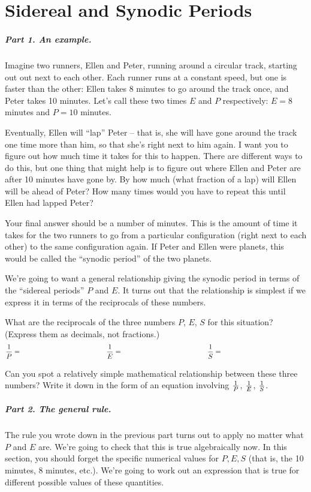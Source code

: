 \chapter{Sidereal and Synodic Periods}


\paragraph{Part 1. An example.}
Imagine two runners, Ellen and Peter,
running around a circular track, starting out
out next to each other. Each runner runs at a constant speed, but one 
is faster than the other: Ellen takes 8 minutes to go around the track
once, and Peter takes 10 minutes. Let's call these two times
$E$ and $P$ respectively: $E=8$ minutes and $P=10$ minutes.


Eventually, Ellen will ``lap'' Peter -- that is, she will have gone around
the track one time more than him, so that she's right
next to him again. I want
you to figure out how much time it takes for this to happen.
There are different ways to do this, but one thing that might help
is to figure out where Ellen and Peter are after 10 minutes have gone by.
By how much (what fraction of a lap) will Ellen will be ahead of 
Peter? How many times would you have to repeat this until Ellen
had lapped Peter?

Your final answer should be a number of minutes. This is the amount
of time it takes for the two runners to go from a particular configuration
(right next to each other) to the same configuration again. If Peter and Ellen
were planets, this would be called the ``synodic period'' of the two planets.

\vskip 2in


We're going to want a general relationship giving the synodic period
in terms of the ``sidereal periods'' $P$ and $E$. It turns
out that the relationship is simplest if we express it in terms
of the reciprocals of these numbers.

What are the reciprocals of the three numbers $P$, $E$, $S$ for
this situation? (Express them as decimals, not fractions.)
$$
{1\over P}=
\hskip 1.7in
{1\over E}=
\hskip 1.7in
{1\over S}=
\hskip 1.7in
$$

Can you spot a relatively simple mathematical relationship
between these three numbers? Write it down in the form of an equation
involving ${1\over P}$, ${1\over E}$, ${1\over S}$.


\vskip 2in


\paragraph{Part 2. The general rule.}
The rule you wrote down in the previous part turns out to apply
no matter what $P$ and $E$ are. We're going to check that this
is true algebraically now. In this section, you should forget 
the specific numerical values for $P,E,S$ (that is, the 10 minutes, 8 minutes,
etc.). We're going to work out an expression that is true
for different possible values of these quantities.

